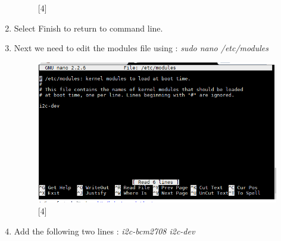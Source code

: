 \documentclass[a4paper,12pt,oneside]{book}
\begin{document}
\begin{enumerate}
\begin{figure}[h!]
			\centering
			\caption{[4]}
		\end{figure}
		\item Select Finish to return to command line.
		\item Next we need to edit the modules file using : \newline \textit{sudo nano /etc/modules} 
		\begin{figure}[h!]
			\includegraphics[scale=0.6]{i2c_7}
			\centering
			\caption{[4]}
		\end{figure}
		\newpage
		\item Add the following two lines : \newline \textit{i2c-bcm2708 \newline i2c-dev}
		

\end{enumerate}
\end{document}
